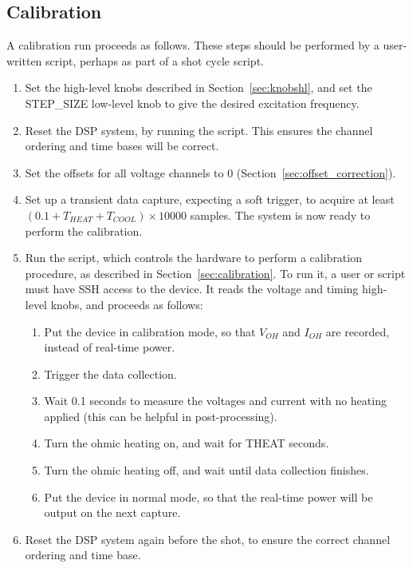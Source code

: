 \documentclass[12pt,a4paper]{article}
\begin{document}
\subsection{Calibration}%
\label{sec:run_calibration}
A calibration run proceeds as follows. These steps should be performed by a user-written script, perhaps as part of a shot cycle script.
\begin{enumerate}
\item{Set the high-level knobs described in Section~\ref{sec:knobshl}, and set the STEP{\_}SIZE low-level knob to give the desired excitation
    frequency.}
\item{Reset the DSP system, by running the \mbox{} script. This ensures the channel ordering and time bases will be
    correct.}
\item{Set the offsets for all voltage channels to 0 (Section~\ref{sec:offset_correction})}.
\item{Set up a transient data capture, expecting a soft trigger, to acquire at least $(0.1 + T_{HEAT} + T_{COOL})\times 10000$ samples. The system is now
    ready to perform the calibration.}
\item{Run the \mbox{} script, which controls the hardware to perform a calibration procedure, as described in
    Section~\ref{sec:calibration}. To run it, a user or script must have SSH access to the device. It reads the voltage and timing high-level knobs, and
    proceeds as follows:
\begin{enumerate}
\item{Put the device in calibration mode, so that $V_{OH}$ and $I_{OH}$ are recorded, instead of real-time power.}
\item{Trigger the data collection.}
\item{Wait 0.1 seconds to measure the voltages and current with no heating applied (this can be helpful in post-processing).}
\item{Turn the ohmic heating on, and wait for THEAT seconds}.
\item{Turn the ohmic heating off, and wait until data collection finishes.}
\item{Put the device in normal mode, so that the real-time power will be output on the next capture.}
\end{enumerate}
}
\item{Reset the DSP system again before the shot, to ensure the correct channel ordering and time base.}
\end{enumerate}
\end{document}
